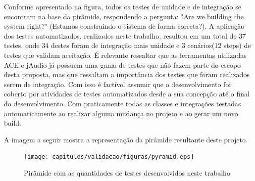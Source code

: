 Conforme apresentado na figura, todos os testes de unidade e de integração se encontram na base da pirâmide, respondendo a pergunta: "Are we building the system right?" (Estamos construindo o sistema de forma correta?).  A  aplicação dos testes automatizados, realizados neste trabalho, resultou  em um total de 37 testes, onde 34 destes foram de integração mais unidade e 3 cenários(12 steps) de testes que validam aceitação. É relevante ressaltar que as ferramentas utilizadas ACE e jAudio já possuem uma gama de testes que não fazem parte do escopo desta proposta, mas que ressaltam a importância dos testes que foram realizados serem de integração. Com isso é factível assumir que o desenvolvimento foi coberto por atividades de testes automatizados desde a sua concepção até o final do desenvolvimento. Com praticamente todas as classes e integrações testadas automaticamente ao realizar alguma mudança no projeto e ao gerar um novo build. 

A imagem a seguir mostra a representação da pirâmide resultante deste projeto. 

\begin{figure}[H]
	\centering
	\captionsetup{justification=centering,margin=2cm}
	\texttt{[image: capitulos/validacao/figuras/pyramid.eps]}
	\caption{Pirâmide com as quantidades de testes desenvolvidos neste trabalho}
	\label{fig:result-engajamento}
\end{figure}

